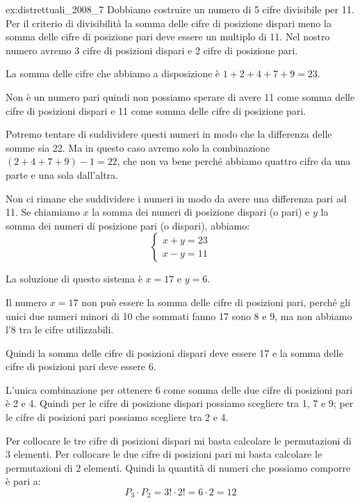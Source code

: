\begin{soluzione}{ex:distrettuali_2008_7}
    Dobbiamo costruire un numero di 5 cifre divisibile per 11.
    Per il criterio di divisibilità la somma delle cifre di posizione dispari meno la somma delle cifre
    di posizione pari deve essere un multiplo di 11.
    Nel nostro numero avremo 3 cifre di posizioni dispari e 2 cifre di posizione pari.

    La somma delle cifre che abbiamo a disposizione è $1 + 2 + 4 + 7 + 9 = 23$.

    Non è un numero pari quindi non possiamo sperare di avere 11 come somma delle cifre di posizioni dispari e 11
    come somma delle cifre di posizione pari.

    Potremo tentare di suddividere questi numeri in modo che la differenza delle somme sia 22.
    Ma in questo caso avremo solo la combinazione $(2  + 4 + 7 + 9) - 1 = 22$, che non va bene perché abbiamo quattro
    cifre da una parte e una sola dall'altra.

    Non ci rimane che suddividere i numeri in modo da avere una differenza pari ad 11.
    Se chiamiamo $x$ la somma dei numeri di posizione dispari (o pari) e $y$ la somma dei numeri di posizione pari (o
    dispari), abbiamo:
    \begin{equation*}
        \begin{cases}
            x + y = 23 \\
            x - y = 11
        \end{cases}
    \end{equation*}

    La soluzione di questo sistema è $x = 17$ e $y = 6$.

    Il numero $x = 17$ non può essere la somma delle cifre di posizioni pari, perché gli unici due numeri minori di 10
    che sommati fanno 17 sono 8 e 9, ma non abbiamo l'8 tra le cifre utilizzabili.

    Quindi la somma delle cifre di posizioni dispari deve essere 17 e la somma delle cifre di posizioni pari deve essere
    6.

    L'unica combinazione per ottenere 6 come somma delle due cifre di posizioni pari è 2 e 4.
    Quindi per le cifre di posizione dispari possiamo scegliere tra 1, 7 e 9;
    per le cifre di posizioni pari possiamo scegliere tra 2 e 4.

    Per collocare le tre cifre di posizioni dispari mi basta calcolare le permutazioni di 3 elementi.
    Per collocare le due cifre di posizioni pari mi basta calcolare le permutazioni di 2 elementi.
    Quindi la quantità di numeri che possiamo comporre è pari a:
    \begin{equation*}
        P_3 \cdot P_2 = 3! \cdot 2! = 6 \cdot 2 = 12
    \end{equation*}
\end{soluzione}

